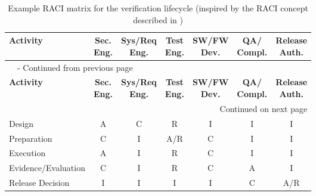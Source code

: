 \begin{longtable}{p{4cm}|c c c c c c} 
	\caption{Example RACI matrix for the verification lifecycle (inspired by the RACI concept described in \cite{cybersierra_security_raci_2026})} 
	\label{tab:raci_matrix_verification}\\ 
	\toprule 
	\textbf{Activity} & \makecell{\textbf{Sec.}\\\textbf{Eng.}} & \makecell{\textbf{Sys/Req}\\\textbf{Eng.}} & \makecell{\textbf{Test}\\\textbf{Eng.}} & \makecell{\textbf{SW/FW}\\\textbf{Dev.}} & \makecell{\textbf{QA/}\\\textbf{Compl.}} & \makecell{\textbf{Release}\\\textbf{Auth.}} \\ \midrule \endfirsthead 
	\multicolumn{7}{l}{\tablename\ \thetable\ - Continued from previous page} \\ \toprule 
	\textbf{Activity} & \makecell{\textbf{Sec.}\\\textbf{Eng.}} & \makecell{\textbf{Sys/Req}\\\textbf{Eng.}} & \makecell{\textbf{Test}\\\textbf{Eng.}} & \makecell{\textbf{SW/FW}\\\textbf{Dev.}} & \makecell{\textbf{QA/}\\\textbf{Compl.}} & \makecell{\textbf{Release}\\\textbf{Auth.}} \\ \midrule \endhead 
	\bottomrule \multicolumn{7}{r}{Continued on next page} \\ \endfoot 
	\bottomrule \endlastfoot 
	Design & A & C & R & I & I & I \\ \addlinespace 
	Preparation & C & I & A/R & C & I & I \\ \addlinespace 
	Execution & A & I & R & C & I & I \\ \addlinespace 
	Evidence/Evaluation & C & I & R & C & A & I \\ \addlinespace 
	Release Decision & I & I & I & I & C & A/R \\ 
\end{longtable}

